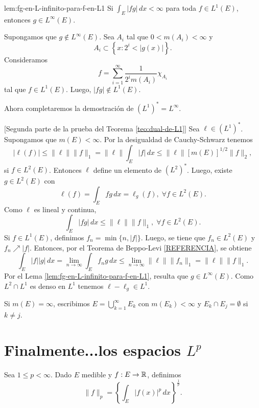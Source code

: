 \begin{lema}{lem:fg-en-L-infinito-para-f-en-L1}
Si 
$
\int_E |fg|\,dx <\infty
$
para toda $f \in L^1(E)$, entonces $g \in L^{\infty}(E)$.
\end{lema}

\begin{demo}
Supongamos que $g \notin L^{\infty}(E)$. Sea $A_i$ tal que $0<m(A_i)<\infty$ y 
\[
A_i\subset \left\{x: 2^i< |g(x)|\right\}.
\]
Consideramos  \[f = \sum\limits_{i=1}^{\infty} \frac{1}{2^im(A_i)} \chi_{A_i} \] tal que $f \in L^1(E)$. 
Luego, $|fg| \notin L^1(E)$.
\end{demo}

Ahora completaremos la demostraci\'on de
$(L^1)^*=L^{\infty}$.

\begin{demo}{}[Segunda parte de la prueba del Teorema \ref{teo:dual-de-L1}]
Sea $\ell \in (L^1)^*$. Supongamos que $m(E)<\infty$.
Por la desigualdad de Cauchy-Schwarz tenemos
\[
|\ell(f)|\leq \|\ell\|\|f\|_1=\|\ell\| \int_E |f|\,dx 
\leq \|\ell\| \left[m(E)\right]^{1/2}\|f\|_2, 
\]
si $f \in L^2(E)$.
Entonces $\ell$ define un elemento de $(L^2)^*$. Luego, existe $g \in L^2(E)$ con 
\[
\ell(f)=\int_E fg\,dx=\ell_g(f), \;\forall f \in L^2(E).
\]
Como $\ell$ es lineal y continua, 
\[
\int_E |fg|\,dx \leq \|\ell\| \|f\|_1, \;\forall f \in L^2(E).
\]
Si $f \in L^1(E)$, definimos $f_n=\min\{n, |f|\}$. Luego,  se tiene que $f_n \in L^2(E)$ y $f_n \nearrow |f|$. Entonces, por el Teorema de Beppo-Levi \ref{REFERENCIA}, se obtiene
\[
\int_E |f| |g|\,dx =\lim\limits_{n \to \infty} \int_E f_n g\,dx 
\leq \lim\limits_{n \to \infty} \|\ell\| \|f_n\|_1
=\|\ell\| \|f\|_1.\]
Por el Lema \ref{lem:fg-en-L-infinito-para-f-en-L1}, resulta que $g \in L^{\infty}(E)$.
Como $L^2 \cap L^1$ es denso en $L^1$ tenemos $\ell-\ell_g \in L^1$.

Si $m(E)=\infty$, escribimos $E=\bigcup\limits_{k=1}^{\infty} E_k$
con $m(E_k)<\infty$ y $E_k \cap E_j=\emptyset$ si $k \neq j$.
\end{demo}





\section{Finalmente...los espacios $L^p$}

Sea $1\leq p<\infty$.  Dado $E$ medible y $f:E\to \mathbb{R}$, definimos 
\[
\|f\|_p=\left\{ \int_E |f(x)|^p\,dx \right\}^{\frac{1}{p}}.
\]

